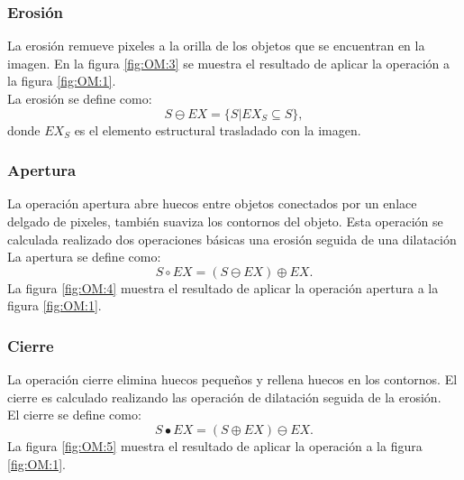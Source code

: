 \subsubsection{Erosión}\label{sssec:OMerosion}
La erosión remueve pixeles a la orilla de los objetos que se encuentran en la imagen. En la figura \ref{fig:OM:3} se muestra el resultado de aplicar la operación a la figura \ref{fig:OM:1}.\\ 
La erosión se define como: 
\begin{equation}
S \ominus EX = \lbrace S|EX_S \subseteq S \rbrace,
\end{equation}
donde $EX_S$ es el elemento estructural trasladado con la imagen. 

\subsubsection{Apertura}\label{sssec:Opening} 
La operación apertura abre huecos entre objetos conectados por un enlace delgado de pixeles, también suaviza los contornos del objeto. Esta operación se calculada realizado dos operaciones básicas una erosión seguida de una dilatación \\ 
La apertura se define como:  
\begin{equation}
S \circ EX = (S \ominus EX) \oplus EX.
\end{equation}
La figura \ref{fig:OM:4} muestra el resultado de aplicar la operación apertura a la figura \ref{fig:OM:1}.

\subsubsection{Cierre}\label{sssec:Closure}
La operación cierre elimina huecos pequeños y rellena huecos en los contornos. El cierre es calculado realizando las operación de dilatación seguida de la erosión.\\
El cierre se define como:
\begin{equation}
S \bullet EX = (S \oplus EX) \ominus EX.
\end{equation}
La figura \ref{fig:OM:5} muestra el resultado de aplicar la operación a la figura \ref{fig:OM:1}.

